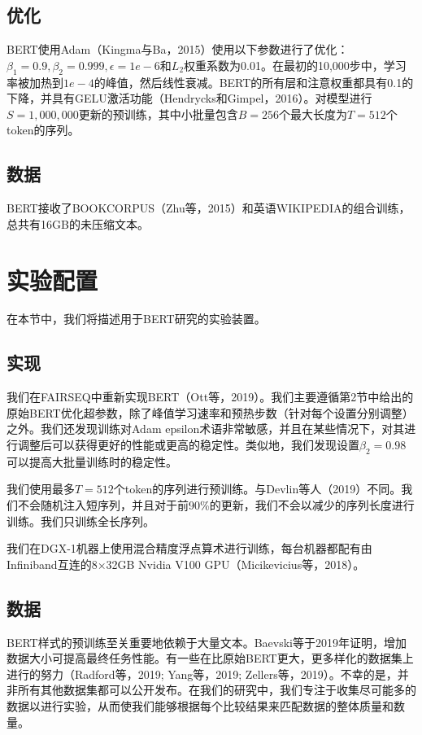 \documentclass[lang=cn,11pt,a4paper,twocolumn]{elegantpaper}
\begin{document}
\subsection{优化}
BERT使用Adam（Kingma与Ba，2015）使用以下参数进行了优化：$\beta_1= 0.9,\beta_2= 0.999,\epsilon=1e-6$和$L_2$权重系数为0.01。在最初的10,000步中，学习率被加热到$1e-4$的峰值，然后线性衰减。BERT的所有层和注意权重都具有0.1的下降，并具有GELU激活功能（Hendrycks和Gimpel，2016）。对模型进行$S = 1,000,000$更新的预训练，其中小批量包含$B = 256$个最大长度为$T = 512$个token的序列。

\subsection{数据}
BERT接收了BOOKCORPUS（Zhu等，2015）和英语WIKIPEDIA的组合训练，总共有16GB的未压缩文本。

\section{实验配置}
在本节中，我们将描述用于BERT研究的实验装置。
\subsection{实现}
我们在FAIRSEQ中重新实现BERT（Ott等，2019）。我们主要遵循第2节中给出的原始BERT优化超参数，除了峰值学习速率和预热步数（针对每个设置分别调整）之外。我们还发现训练对Adam epsilon术语非常敏感，并且在某些情况下，对其进行调整后可以获得更好的性能或更高的稳定性。类似地，我们发现设置$\beta_2= 0.98$可以提高大批量训练时的稳定性。

我们使用最多$T = 512$个token的序列进行预训练。与Devlin等人（2019）不同。我们不会随机注入短序列，并且对于前90\%的更新，我们不会以减少的序列长度进行训练。我们只训练全长序列。

我们在DGX-1机器上使用混合精度浮点算术进行训练，每台机器都配有由Infiniband互连的8×32GB Nvidia V100 GPU（Micikevicius等，2018）。
\subsection{数据}
BERT样式的预训练至关重要地依赖于大量文本。Baevski等于2019年证明，增加数据大小可提高最终任务性能。有一些在比原始BERT更大，更多样化的数据集上进行的努力（Radford等，2019; Yang等，2019; Zellers等，2019）。不幸的是，并非所有其他数据集都可以公开发布。在我们的研究中，我们专注于收集尽可能多的数据以进行实验，从而使我们能够根据每个比较结果来匹配数据的整体质量和数量。
\end{document}
